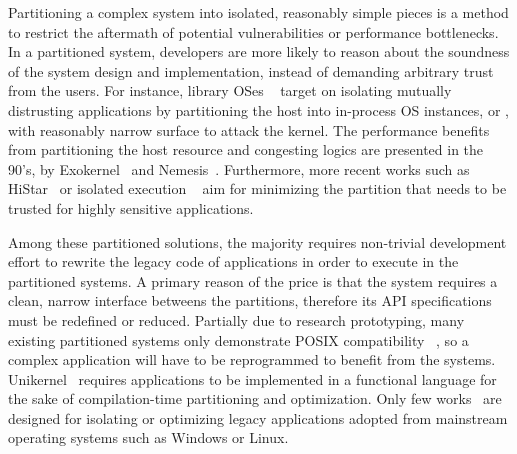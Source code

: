 Partitioning a complex system into
isolated, reasonably simple pieces
is a method
to restrict the aftermath of potential vulnerabilities or
performance bottlenecks.
In a partitioned system, developers are more likely to reason about
the soundness of the system design and implementation,
instead of demanding arbitrary trust from the users.
For instance, library OSes
~\citep{porter11drawbridge, baumann13bascule, unikernels}
target on isolating mutually distrusting applications
by partitioning the host into in-process OS instances,
or \emph{\picoprocs{}},
with reasonably narrow surface to attack the kernel.
The performance benefits
from partitioning the host resource and congesting logics
are presented in the 90's,
by Exokernel~\citep{engler95exokernel}
and Nemesis~\citep{leslie96nemesis}.
Furthermore, more recent works such as HiStar~\citep{zeldovich+histar}
or isolated execution
~\citep{flicker, trustzone, intelsgx, criswell2014virtualghost}
aim for minimizing the partition that needs to be trusted
for highly sensitive applications.



Among these partitioned solutions,
the majority requires non-trivial development effort to 
rewrite the legacy code of applications
in order to execute in the partitioned systems.
A primary reason of the price
is that the system
requires a clean, narrow interface betweens the partitions,
therefore its API specifications
must be redefined or reduced.
Partially due to research prototyping,
many existing partitioned systems only demonstrate POSIX compatibility
~\citep{engler95exokernel, leslie96nemesis, zeldovich+histar},
so a complex application
will have to be reprogrammed to benefit from the systems.
Unikernel~\citep{unikernels} requires applications to be implemented
in a functional language for the sake of compilation-time
partitioning and optimization.
Only few works~\citep{porter11drawbridge, baumann13bascule, tsai14graphene}
are designed for isolating or optimizing
legacy applications adopted from mainstream operating systems such as Windows or Linux.


